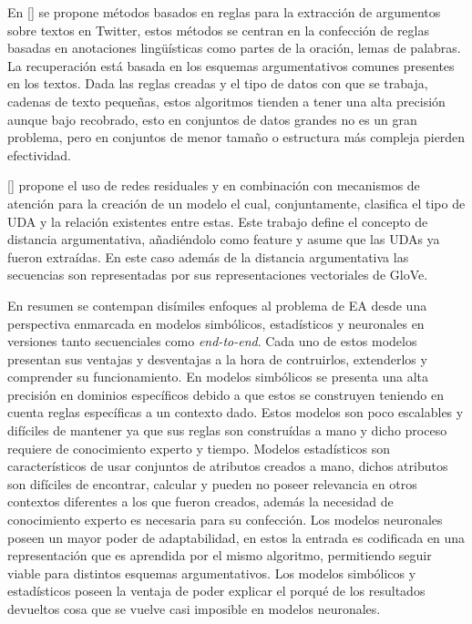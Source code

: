 En [\cite{dykes2020reconstructing}] se propone métodos basados en reglas para la extracción de argumentos sobre
textos en Twitter, estos métodos se centran en la confección de reglas basadas en anotaciones lingüísticas como
partes de la oración, lemas de palabras. La recuperación está basada en los esquemas argumentativos comunes presentes
en los textos. Dada las reglas creadas y el tipo
de datos con que se trabaja, cadenas de texto pequeñas, estos algoritmos tienden a tener una alta precisión aunque 
bajo recobrado, esto en conjuntos de datos grandes no es un gran problema, pero en conjuntos de menor tamaño o estructura 
más compleja pierden efectividad.

[\cite{galassi2021deep}] propone el uso de redes residuales y en combinación con mecanismos de atención
para la creación de un modelo el cual, conjuntamente, clasifica el tipo de UDA y la relación existentes entre estas.
Este trabajo define el concepto de distancia argumentativa, añadiéndolo como feature y asume que las UDAs ya fueron 
extraídas. En este caso además de la distancia argumentativa las secuencias son representadas por sus representaciones
vectoriales de GloVe.

En resumen se contempan disímiles enfoques al problema de EA desde una perspectiva enmarcada en modelos 
simbólicos, estadísticos y neuronales en versiones tanto secuenciales como \emph{end-to-end}. 
Cada uno de estos modelos presentan sus ventajas y desventajas a la hora de contruirlos, 
extenderlos y comprender su funcionamiento. En modelos simbólicos se presenta una alta
precisión en dominios específicos debido a que estos se construyen teniendo en cuenta reglas específicas a un
contexto dado. Estos modelos son poco escalables y difíciles de mantener ya que sus reglas son construídas
a mano y dicho proceso requiere de conocimiento experto y tiempo. Modelos estadísticos son
característicos de usar conjuntos de atributos creados a mano, dichos atributos son difíciles
de encontrar, calcular y pueden no poseer relevancia en otros contextos diferentes a los que fueron creados,
además la necesidad de conocimiento experto es necesaria para su confección. Los modelos neuronales poseen
un mayor poder de adaptabilidad, en estos la entrada es codificada en una representación que es aprendida por
el mismo algoritmo, permitiendo seguir viable para distintos esquemas argumentativos. Los modelos simbólicos y 
estadísticos poseen la ventaja de poder explicar el porqué de los resultados devueltos cosa que se vuelve casi
imposible en modelos neuronales.

